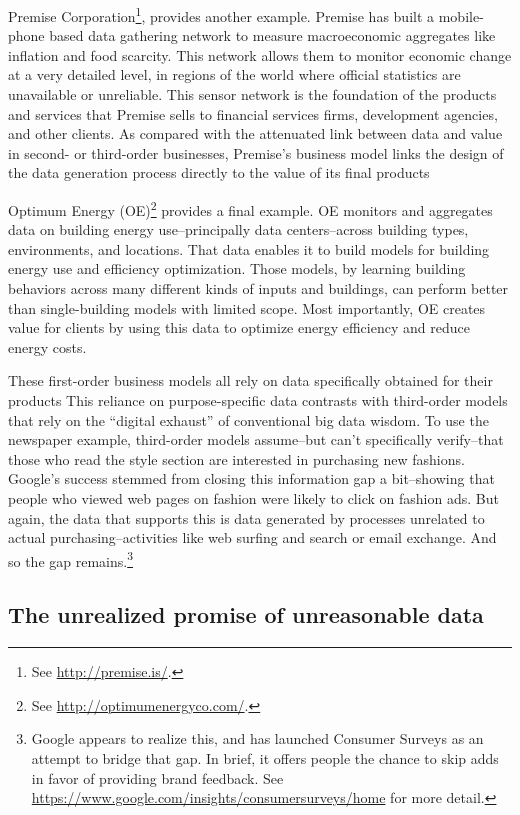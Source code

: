 \documentclass[12pt]{article}
\begin{document}
Premise Corporation\footnote{See \url{http://premise.is/}.}, provides another example. Premise has built a mobile-phone
based data gathering network to measure
macroeconomic aggregates like inflation and food scarcity. This
network allows them to monitor economic change at a very detailed
level, in regions of the world where official statistics
are unavailable or unreliable. This sensor network is the foundation
of the products and services that Premise sells to financial services
firms, development agencies, and other clients. As compared with the
attenuated link between data and value in second- or third-order
businesses, Premise's business model links the design of the data
generation process directly to the value of its final products

Optimum Energy (OE)\footnote{See \url{http://optimumenergyco.com/}.} provides a final example. OE monitors and
aggregates data on building energy use--principally data
centers--across building types, environments, and locations. That data
enables it to build models for building energy use and efficiency
optimization. Those models, by learning building behaviors across many
different kinds of inputs and buildings, can perform better than
single-building models with limited scope. Most importantly, OE
creates value for clients by using this data to optimize energy
efficiency and reduce energy costs.

These first-order business models all rely on data specifically
obtained for their products This reliance on purpose-specific data contrasts with third-order
models that rely on the ``digital exhaust'' of conventional big data
wisdom. To use the newspaper example, third-order models assume--but
can't specifically verify--that those who read the style section are
interested in purchasing new fashions. Google's success stemmed from closing this
information gap a bit--showing that people who viewed web pages on
fashion were likely to click on fashion ads. But
again, the data that supports this is data generated by processes
unrelated to actual purchasing--activities like web surfing and search
or email exchange. And so the gap remains.\footnote{Google appears to
  realize this, and has launched Consumer Surveys as an attempt to
  bridge that gap. In brief, it offers people the chance to skip adds
  in favor of providing brand feedback. See
  \url{https://www.google.com/insights/consumersurveys/home} for more detail.}



\subsection{The unrealized promise of unreasonable data}
\label{sec:unre-prom-unre}
\end{document}

